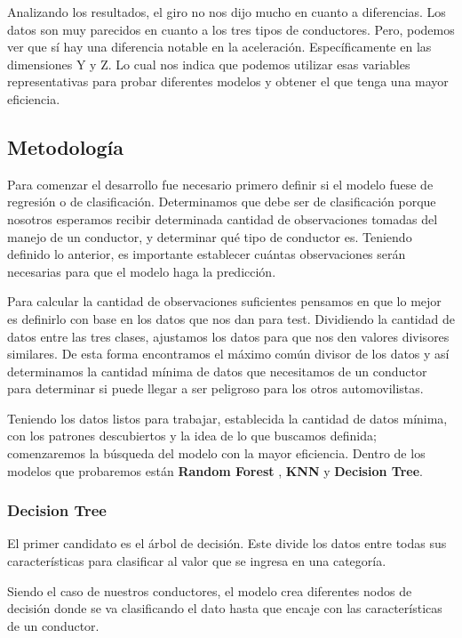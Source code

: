 \documentclass{article}
\begin{document}
        Analizando los resultados, el giro no nos dijo mucho en cuanto a diferencias. Los datos son muy parecidos en cuanto a los tres tipos de conductores. Pero, podemos ver que sí hay una diferencia notable en la aceleración. Específicamente en las dimensiones Y y Z. Lo cual nos indica que podemos utilizar esas variables representativas para probar diferentes modelos y obtener el que tenga una mayor eficiencia.
        

    \subsection{Metodología}

        Para comenzar el desarrollo fue necesario primero definir si el modelo fuese de regresión o de clasificación. Determinamos que debe ser de clasificación porque nosotros esperamos recibir determinada cantidad de observaciones tomadas del manejo de un conductor, y determinar qué tipo de conductor es. Teniendo definido lo anterior, es importante establecer cuántas observaciones serán necesarias para que el modelo haga la predicción. 
        
        Para calcular la cantidad de observaciones suficientes pensamos en que lo mejor es definirlo con base en los datos que nos dan para test. Dividiendo la cantidad de datos entre las tres clases, ajustamos los datos para que nos den valores divisores similares. De esta forma encontramos el máximo común divisor de los datos y así determinamos la cantidad mínima de datos que necesitamos de un conductor para determinar si puede llegar a ser peligroso para los otros automovilistas.

        Teniendo los datos listos para trabajar, establecida la cantidad de datos mínima, con los patrones descubiertos y la idea de lo que buscamos definida; comenzaremos la búsqueda del modelo con la mayor eficiencia. Dentro de los modelos que probaremos están \textbf{Random Forest} , \textbf{KNN} y \textbf{Decision Tree}.

        \subsubsection{Decision Tree}

            El primer candidato es el árbol de decisión. Este divide los datos entre todas sus características para clasificar al valor que se ingresa en una categoría. 
            
            Siendo el caso de nuestros conductores, el modelo crea diferentes nodos de decisión donde se va clasificando el dato hasta que encaje con las características de un conductor. 
\end{document}

